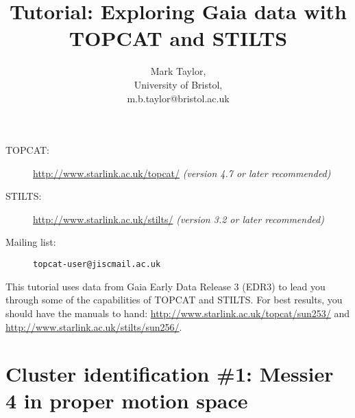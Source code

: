 \documentclass{article}
\newcommand{\turl}[1]{{\color{blue}\url{#1}}}
\begin{document}
\raggedright

\title{Tutorial: Exploring Gaia data with TOPCAT and STILTS}
\author{Mark Taylor,\\
        University of Bristol,\\
        m.b.taylor@bristol.ac.uk}
\date{\vspace*{-4ex}}  %

\maketitle

\begin{description}
  \item[TOPCAT:] \turl{http://www.starlink.ac.uk/topcat/}
                 {\em (version 4.7 or later recommended)}
  \item[STILTS:] \turl{http://www.starlink.ac.uk/stilts/}
                 {\em (version 3.2 or later recommended)}
  \item[Mailing list:] {\tt topcat-user@jiscmail.ac.uk}
\end{description}
\tableofcontents

\vspace*{2cm}
\begin{center}
  \color{grey}
  {\tt }
\end{center}

\newpage

This tutorial uses data from Gaia Early Data Release 3 (EDR3) \cite{edr3}
to lead you through some of the capabilities of TOPCAT and STILTS.
For best results, you should have the manuals to hand:
\url{http://www.starlink.ac.uk/topcat/sun253/} and
\url{http://www.starlink.ac.uk/stilts/sun256/}.

\section{Cluster identification \#1: Messier 4 in proper motion space}
\end{document}
